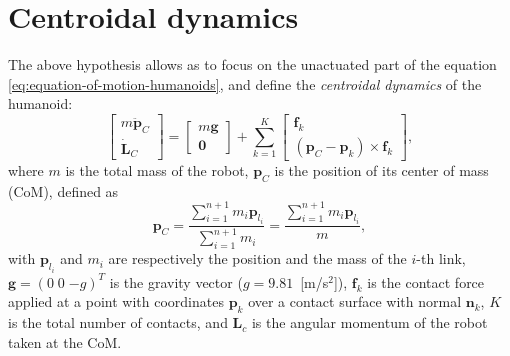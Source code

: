 \section{Centroidal dynamics}
The above hypothesis allows as to focus on the unactuated part of the equation
\eqref{eq:equation-of-motion-humanoids}, and define the
\textit{centroidal dynamics} \cite{Orin2013CentroidalDynamics} of the humanoid:
\begin{equation}
    \label{eq:centroidal-dynamics}
    \begin{bmatrix}
        m \ddot{\bm{p}}_C \\ \dot{\bm{L}}_C
    \end{bmatrix} =
    \begin{bmatrix}
        m \bm{g} \\ \bm{0}
    \end{bmatrix} +
    \sum_{k=1}^K
    \begin{bmatrix}
        \bm{f}_k \\ (\bm{p}_C - \bm{p}_k) \times \bm{f}_k
    \end{bmatrix},
\end{equation}
where $m$ is the total mass of the robot, $\bm{p}_C$ is the position of its
center of mass (CoM), defined as
\begin{equation*}
    \bm{p}_C =
    \frac{\sum_{i=1}^{n+1} m_i \bm{p}_{l_i}}{\sum_{i=1}^{n+1} m_i} =
    \frac{\sum_{i=1}^{n+1} m_i \bm{p}_{l_i}}{m},
\end{equation*}
with $\bm{p}_{l_i}$ and $m_i$ are respectively the position and the mass of the $i$-th link, 
$\bm{g} = (0 \; 0 \; {-g})^T$ is the gravity vector ($g=9.81$~[m/s$^2$]), $\bm{f}_k$ is the contact force
applied at a point with coordinates $\bm{p}_k$ over a contact surface with normal
$\bm{n}_k$, $K$ is the total number of contacts, and $\bm{L}_c$ is the angular
momentum of the robot taken at the CoM.

